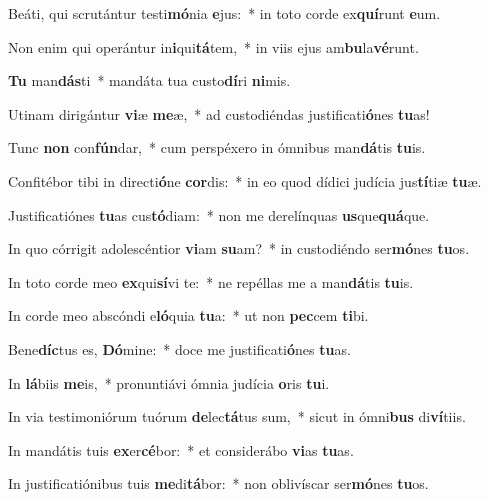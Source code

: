 \item Beáti, qui scrutántur testi\textbf{mó}nia \textbf{e}jus:~* in toto corde ex\textbf{quí}runt \textbf{e}um.
\item Non enim qui operántur in\textbf{i}qui\textbf{tá}tem,~* in viis ejus am\textbf{bu}la\textbf{vé}runt.
\item \textbf{Tu} man\textbf{dás}ti~* mandáta tua custo\textbf{dí}ri \textbf{ni}mis.
\item Utinam dirigántur \textbf{vi}æ \textbf{me}æ,~* ad custodiéndas justificati\textbf{ó}nes \textbf{tu}as!
\item Tunc \textbf{non} con\textbf{fún}dar,~* cum perspéxero in ómnibus man\textbf{dá}tis \textbf{tu}is.
\item Confitébor tibi in directi\textbf{ó}ne \textbf{cor}dis:~* in eo quod dídici judícia jus\textbf{tí}tiæ \textbf{tu}æ.
\item Justificatiónes \textbf{tu}as cus\textbf{tó}diam:~* non me derelínquas \textbf{us}que\textbf{quá}que.
\item In quo córrigit adolescéntior \textbf{vi}am \textbf{su}am?~* in custodiéndo ser\textbf{mó}nes \textbf{tu}os.
\item In toto corde meo \textbf{ex}qui\textbf{sí}vi te:~* ne repéllas me a man\textbf{dá}tis \textbf{tu}is.
\item In corde meo abscóndi e\textbf{ló}quia \textbf{tu}a:~* ut non \textbf{pec}cem \textbf{ti}bi.
\item Bene\textbf{díc}tus es, \textbf{Dó}mine:~* doce me justificati\textbf{ó}nes \textbf{tu}as.
\item In \textbf{lá}biis \textbf{me}is,~* pronuntiávi ómnia judícia \textbf{o}ris \textbf{tu}i.
\item In via testimoniórum tuórum \textbf{de}lec\textbf{tá}tus sum,~* sicut in ómni\textbf{bus} di\textbf{ví}tiis.
\item In mandátis tuis \textbf{ex}er\textbf{cé}bor:~* et considerábo \textbf{vi}as \textbf{tu}as.
\item In justificatiónibus tuis \textbf{me}di\textbf{tá}bor:~* non oblivíscar ser\textbf{mó}nes \textbf{tu}os.
